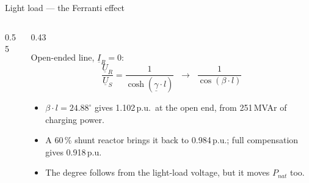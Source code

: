\begin{frame}{Light load --- the Ferranti effect}
  \begin{columns}[c,onlytextwidth]
    \begin{column}{0.55\textwidth}\centering
    \end{column}
    \begin{column}{0.43\textwidth}
      {\small Open-ended line, $\underline{I}_R=0$:
      \[ \frac{\underline{U}_R}{\underline{U}_S}
         = \frac{1}{\cosh\!\left(\underline{\gamma}\cdot l\right)}
         \;\;\longrightarrow\;\;
         \frac{1}{\cos\!\left(\beta\cdot l\right)} \]
      \begin{itemize}
        \setlength{\itemsep}{0.3em}
        \item $\beta\cdot l=24.88^\circ$ gives 1.102\,p.u.\ at the open end,
              from 251\,MVAr of charging power.
        \item A 60\,\% shunt reactor brings it back to 0.984\,p.u.; full
              compensation gives 0.918\,p.u.
        \item The degree follows from the light-load voltage, but it moves
              $P_{nat}$ too.
      \end{itemize}}
    \end{column}
  \end{columns}
\end{frame}

